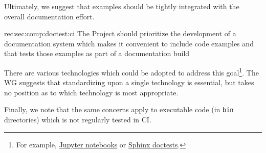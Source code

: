 Ultimately, we suggest that examples should be tightly integrated with the overall documentation effort.


\begin{recommendation}
    {rec:sec:comp:doctest:ci}
    {The Project should prioritize the development of a documentation system which makes it convenient to include code examples and that tests those examples as part of a documentation build}
\end{recommendation}

There are various technologies which could be adopted to address this goal\footnote{For example, \href{https://jupyter.org/}{Jupyter notebooks} or \href{http://www.sphinx-doc.org/en/stable/ext/doctest.html}{Sphinx doctests}.}.
The WG suggests that standardizing upon a single technology is essential, but takes no position as to which technology is most appropriate.

Finally, we note that the same concerns apply to executable code (in \texttt{bin} directories) which is not regularly tested in CI.
